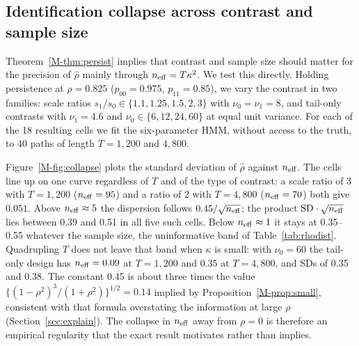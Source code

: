 \documentclass[11pt,a4paper]{article}
\theoremstyle{plain}
\theoremstyle{remark}
\begin{document}
\subsection{Identification collapse across contrast and sample size}\label{sec:collapse}
Theorem~\ref{M-thm:persist} implies that contrast and sample size should matter for the precision of $\hat\rho$ mainly through $n_{\rm eff}=T\kappa^2$. We test this directly. Holding persistence at $\rho=0.825$ ($p_{00}=0.975$, $p_{11}=0.85$), we vary the contrast in two families: scale ratios $s_1/s_0\in\{1.1,1.25,1.5,2,3\}$ with $\nu_0=\nu_1=8$, and tail-only contrasts with $\nu_1=4.6$ and $\nu_0\in\{6,12,24,60\}$ at equal unit variance. For each of the 18 resulting cells we fit the six-parameter HMM, without access to the truth, to 40 paths of length $T=1{,}200$ and $4{,}800$.

Figure~\ref{M-fig:collapse} plots the standard deviation of $\hat\rho$ against $n_{\rm eff}$. The cells line up on one curve regardless of $T$ and of the type of contrast: a scale ratio of 3 with $T=1{,}200$ ($n_{\rm eff}=95$) and a ratio of 2 with $T=4{,}800$ ($n_{\rm eff}=70$) both give $0.051$. Above $n_{\rm eff}\approx5$ the dispersion follows $0.45/\sqrt{n_{\rm eff}}$; the product $\mathrm{SD}\cdot\sqrt{n_{\rm eff}}$ lies between 0.39 and 0.51 in all five such cells. Below $n_{\rm eff}\approx1$ it stays at 0.35--0.55 whatever the sample size, the uninformative band of Table~\ref{tab:rhodist}. Quadrupling $T$ does not leave that band when $\kappa$ is small: with $\nu_0=60$ the tail-only design has $n_{\rm eff}=0.09$ at $T=1{,}200$ and $0.35$ at $T=4{,}800$, and SDs of 0.35 and 0.38. The constant 0.45 is about three times the value $\{(1-\rho^2)^3/(1+\rho^2)\}^{1/2}=0.14$ implied by Proposition~\ref{M-prop:small}, consistent with that formula overstating the information at large $\rho$ (Section~\ref{sec:explain}). The collapse in $n_{\rm eff}$ away from $\rho=0$ is therefore an empirical regularity that the exact result motivates rather than implies.
\end{document}

